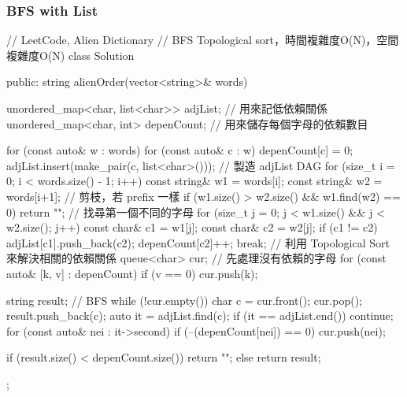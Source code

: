 \subsubsection{BFS with List}
\begin{Code}
// LeetCode, Alien Dictionary
// BFS Topological sort，時間複雜度O(N)，空間複雜度O(N)
class Solution {
public:
    string alienOrder(vector<string>& words) {
        unordered_map<char, list<char>> adjList; // 用來記低依賴關係
        unordered_map<char, int> depenCount; // 用來儲存每個字母的依賴數目

        for (const auto& w : words)
            for (const auto& c : w)
            {
                depenCount[c] = 0;
                adjList.insert(make_pair(c, list<char>()));
            }
        // 製造 adjList DAG
        for (size_t i = 0; i < words.size() - 1; i++)
        {
            const string& w1 = words[i];
            const string& w2 = words[i+1];
            // 剪枝，若 prefix 一樣
            if (w1.size() > w2.size() && w1.find(w2) == 0) return "";
            // 找尋第一個不同的字母
            for (size_t j = 0; j < w1.size() && j < w2.size(); j++)
            {
                const char& c1 = w1[j];
                const char& c2 = w2[j];
                if (c1 != c2)
                {
                    adjList[c1].push_back(c2);
                    depenCount[c2]++;
                    break;
                }
            }
        }
        // 利用 Topological Sort 來解決相關的依賴關係
        queue<char> cur;
        // 先處理沒有依賴的字母
        for (const auto& [k, v] : depenCount)
            if (v == 0)
                cur.push(k);

        string result;
        // BFS
        while (!cur.empty())
        {
            char c = cur.front();
            cur.pop();
            result.push_back(c);
            auto it = adjList.find(c);
            if (it == adjList.end()) continue;
            for (const auto& nei : it->second)
            {
                if (--(depenCount[nei]) == 0)
                    cur.push(nei);
            }
        }

        if (result.size() < depenCount.size())
            return "";
        else
            return result;
    }
};
\end{Code}

